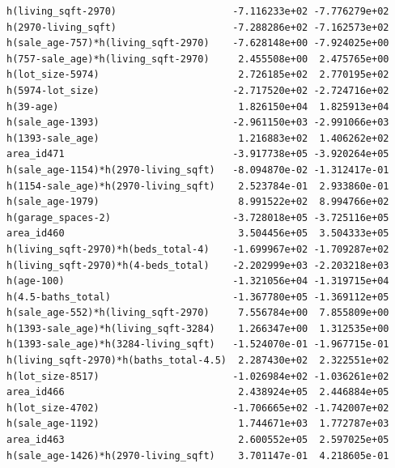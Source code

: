 \documentclass[
]{article}
\begin{document}
\begin{verbatim}
h(living_sqft-2970)                    -7.116233e+02 -7.776279e+02
h(2970-living_sqft)                    -7.288286e+02 -7.162573e+02
h(sale_age-757)*h(living_sqft-2970)    -7.628148e+00 -7.924025e+00
h(757-sale_age)*h(living_sqft-2970)     2.455508e+00  2.475765e+00
h(lot_size-5974)                        2.726185e+02  2.770195e+02
h(5974-lot_size)                       -2.717520e+02 -2.724716e+02
h(39-age)                               1.826150e+04  1.825913e+04
h(sale_age-1393)                       -2.961150e+03 -2.991066e+03
h(1393-sale_age)                        1.216883e+02  1.406262e+02
area_id471                             -3.917738e+05 -3.920264e+05
h(sale_age-1154)*h(2970-living_sqft)   -8.094870e-02 -1.312417e-01
h(1154-sale_age)*h(2970-living_sqft)    2.523784e-01  2.933860e-01
h(sale_age-1979)                        8.991522e+02  8.994766e+02
h(garage_spaces-2)                     -3.728018e+05 -3.725116e+05
area_id460                              3.504456e+05  3.504333e+05
h(living_sqft-2970)*h(beds_total-4)    -1.699967e+02 -1.709287e+02
h(living_sqft-2970)*h(4-beds_total)    -2.202999e+03 -2.203218e+03
h(age-100)                             -1.321056e+04 -1.319715e+04
h(4.5-baths_total)                     -1.367780e+05 -1.369112e+05
h(sale_age-552)*h(living_sqft-2970)     7.556784e+00  7.855809e+00
h(1393-sale_age)*h(living_sqft-3284)    1.266347e+00  1.312535e+00
h(1393-sale_age)*h(3284-living_sqft)   -1.524070e-01 -1.967715e-01
h(living_sqft-2970)*h(baths_total-4.5)  2.287430e+02  2.322551e+02
h(lot_size-8517)                       -1.026984e+02 -1.036261e+02
area_id466                              2.438924e+05  2.446884e+05
h(lot_size-4702)                       -1.706665e+02 -1.742007e+02
h(sale_age-1192)                        1.744671e+03  1.772787e+03
area_id463                              2.600552e+05  2.597025e+05
h(sale_age-1426)*h(2970-living_sqft)    3.701147e-01  4.218605e-01
                                                    

\end{verbatim}
\end{document}
